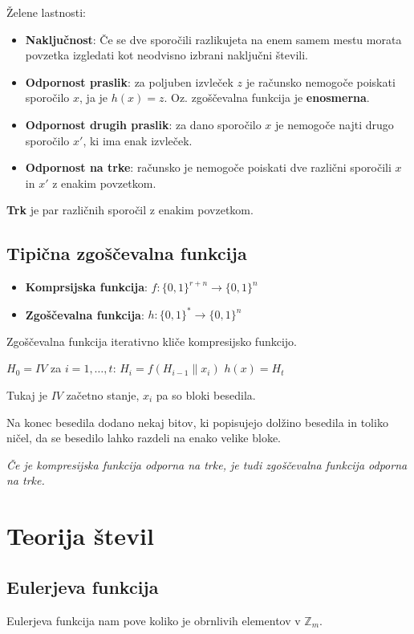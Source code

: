 \begin{multicols}{5}
Želene lastnosti:
\begin{itemize}
	\item \textbf{Naključnost}: Če se dve sporočili razlikujeta na enem samem mestu morata povzetka izgledati kot neodvisno izbrani naključni števili.
	\item \textbf{Odpornost praslik}: za poljuben izvleček $z$ je računsko nemogoče poiskati sporočilo $x$, ja je $h(x) = z$. Oz. zgoščevalna funkcija je \textbf{enosmerna}.
	\item \textbf{Odpornost drugih praslik}: za dano sporočilo $x$ je nemogoče najti drugo sporočilo $x'$, ki ima enak izvleček.
	\item \textbf{Odpornost na trke}: računsko je nemogoče poiskati dve različni sporočili $x$ in $x'$ z enakim povzetkom.
\end{itemize}
\textbf{Trk} je par različnih sporočil z enakim povzetkom.

\subsection*{Tipična zgoščevalna funkcija}
\begin{itemize}
	\item \textbf{Komprsijska funkcija}: $f: \{0,1\}^{r+n} \to \{0,1\}^n$
	\item \textbf{Zgoščevalna funkcija}: $h: \{0,1\}^* \to \{0,1\}^n$
\end{itemize}

Zgoščevalna funkcija iterativno kliče kompresijsko funkcijo.

\begin{koda}
$H_0 = IV$
za $i = 1, \dots, t$:
	$H_i = f(H_{i-1} \| x_i)$
$h(x) = H_t$
\end{koda}

Tukaj je $IV$ začetno stanje, $x_i$ pa so bloki besedila.

Na konec besedila dodano nekaj bitov, ki popisujejo dolžino besedila in toliko ničel, da se besedilo lahko razdeli na enako velike bloke.

\textit{Če je kompresijska funkcija odporna na trke, je tudi zgoščevalna funkcija odporna na trke.}

\section*{Teorija števil}

\subsection{Eulerjeva funkcija}
Eulerjeva funkcija nam pove koliko je obrnlivih elementov v $\mathbb{Z}_m$.


\end{multicols}
